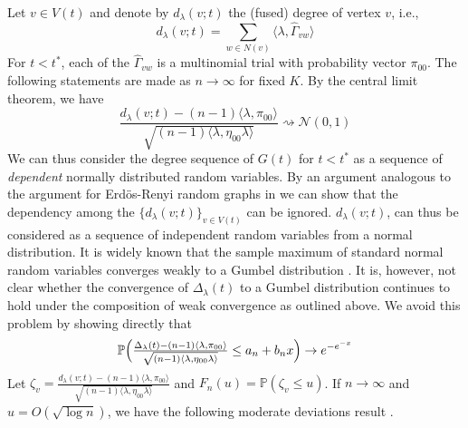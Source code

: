 \documentclass[final]{IEEEtran}
\theoremstyle{definition}
\begin{document}
\begin{IEEEproof}
  Let $v \in V(t)$ and denote by $d_{\lambda}(v;t)$ the (fused) degree
  of vertex $v$, i.e.,
  \begin{equation*}
    d_{\lambda}(v;t) = \sum_{w \in N(v)} \langle \lambda,
    \widehat{\Gamma}_{vw} \rangle
  \end{equation*}
  For $t < t^{*}$, each of the $\widehat{\Gamma}_{vw}$ is a multinomial
  trial with probability vector $\pi_{00}$. The following statements are
  made as $n \rightarrow \infty$ for fixed
  $K$.  By the central limit theorem, we have
  \begin{equation}
    \label{eq:17}
    \frac{d_{\lambda}(v;t) - (n-1) \langle \lambda, \pi_{00}
      \rangle}{\sqrt{(n-1) \langle \lambda, \eta_{00} \lambda \rangle}}
      \rightsquigarrow \mathcal{N}(0, 1)
    \end{equation}
    We can thus consider the degree sequence of $G(t)$ for $t < t^{*}$
    as a sequence of {\em dependent} normally distributed random
    variables. By an argument analogous to the argument for
    Erd\"{o}s-Renyi random graphs in \cite[\S
    III.1]{bollobas85:_random_graph} we can show that the dependency
    among the $\{d_{\lambda}(v;t)\}_{v \in V(t)}$ can be
    ignored. $d_{\lambda}(v;t)$, can thus be considered as a sequence
    of independent random variables from a normal distribution. It is
    widely known that the sample maximum of standard normal random
    variables converges weakly to a Gumbel distribution \cite[\S
    2.3]{galambos87:_asymp_theor_extrem_order_statis}. It is, however,
    not clear whether the convergence of $\Delta_{\lambda}(t)$ to a
    Gumbel distribution continues to hold under the composition of
    weak convergence as outlined above. We avoid this problem by
    showing directly that
    \begin{equation}
      \label{eq:22}
  \mathbb{P}\Bigl(\tfrac{\Delta_{\lambda}(t) - (n-1)
        \langle \lambda, \pi_{00} \rangle}{\sqrt{(n-1) \langle
          \lambda, \eta_{00} \lambda \rangle}} \leq a_n + b_n x\Big)
      \rightarrow 
      e^{-e^{-x}} 
    \end{equation}
    Let $\zeta_v = \tfrac{d_{\lambda}(v;t) - (n-1) \langle \lambda,
      \pi_{00} \rangle}{\sqrt{(n-1) \langle \lambda, \eta_{00} \lambda
        \rangle}}$ and $F_n(u) = \mathbb{P}(\zeta_v \leq u)$. If $n
    \rightarrow \infty$ and $u = O(\sqrt{\log{n}})$, we have the
    following moderate deviations result \cite[Theorem~2, \S
    XVI.7]{feller71:_introd_probab_theor_its_applic,rubin65:_probab}.

\end{IEEEproof}
\end{document}
